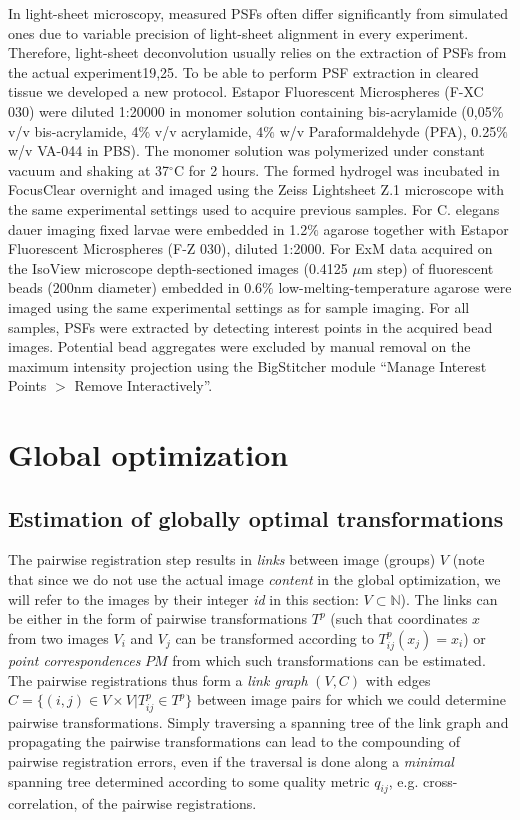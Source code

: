 In light-sheet microscopy, measured PSFs often differ significantly from simulated ones due to variable precision of light-sheet alignment in every experiment. Therefore, light-sheet deconvolution usually relies on the extraction of PSFs from the actual experiment19,25. To be able to perform PSF extraction in cleared tissue we developed a new protocol. Estapor Fluorescent Microspheres (F-XC 030) were diluted 1:20000 in monomer solution containing bis-acrylamide (0,05$\%$ v/v bis-acrylamide, 4$\%$ v/v acrylamide, 4$\%$ w/v Paraformaldehyde (PFA), 0.25$\%$ w/v VA-044 in PBS). The monomer solution was polymerized under constant vacuum and shaking at 37${}^\circ$C for 2 hours.  The formed hydrogel was incubated in FocusClear overnight and imaged using the Zeiss Lightsheet Z.1 microscope with the same experimental settings used to acquire previous samples. For C. elegans dauer imaging fixed larvae were embedded in 1.2$\%$ agarose together with Estapor Fluorescent Microspheres (F-Z 030), diluted 1:2000. For ExM data acquired on the IsoView microscope depth-sectioned images (0.4125 $\mu$m step) of fluorescent beads (200nm diameter) embedded in 0.6$\%$ low-melting-temperature agarose were imaged using the same experimental settings as for sample imaging. For all samples, PSFs were extracted by detecting interest points in the acquired bead images. Potential bead aggregates were excluded by manual removal on the maximum intensity projection using the BigStitcher module “Manage Interest Points $>$ Remove Interactively”.

\section{Global optimization}
\label{ssec:globalopt}

\subsection*{Estimation of globally optimal transformations}

The pairwise registration step results in \emph{links} between image (groups) $V$ (note that since we do not use the actual image \emph{content} in the global optimization, we will refer to the images by their integer \emph{id} in this section: $V \subset \mathbb{N}$). The links can be either in the form of pairwise transformations $T^{p}$  (such that coordinates $x$ from two images $V_i$ and $V_j$ can be transformed according to $T^p_{ij} (x_{j}) = x_i$) or \emph{point correspondences} $PM$ from which such transformations can be estimated.
The pairwise registrations thus form a \emph{link graph} $(V, C)$ with edges $C = \{(i,j) \in V \times V | T^p_{ij} \in T^p \}$ between image pairs for which we could determine pairwise transformations. Simply traversing a spanning tree of the link graph and propagating the pairwise transformations can lead to the compounding of pairwise registration errors, even if the traversal is done along a \emph{minimal} spanning tree determined according to some quality metric $q_{ij}$, e.g. cross-correlation, of the pairwise registrations.

